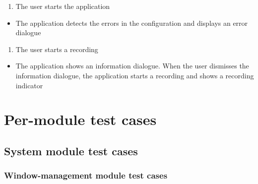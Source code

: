 \begin{tests}
    {\begin{enumerate}
        \item The \gls{user} starts the application
    \end{enumerate}}
    {\begin{itemize}
        \item The application detects the errors in the configuration and displays an error dialogue
    \end{itemize}}

    {\begin{enumerate}
        \item The \gls{user} starts a recording
    \end{enumerate}}
    {\begin{itemize}
        \item The application shows an information dialogue. When the \gls{user} dismisses the information dialogue, the application starts a recording and shows a recording indicator
    \end{itemize}}
\end{tests}

\section{Per-module test cases}

\subsection{System module test cases}

\subsubsection{Window-management module test cases}

